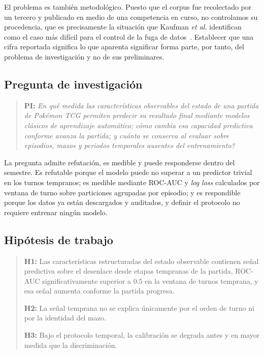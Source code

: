 \documentclass[conference]{IEEEtran}
\begin{document}
El problema es tambi\'en metodol\'ogico. Puesto que el corpus fue
recolectado por un tercero y publicado en medio de una competencia en
curso, no controlamos su procedencia, que es precisamente la situaci\'on
que Kaufman \textit{et al.} identifican como el caso m\'as dif\'icil para
el control de la fuga de datos~\cite{kaufman_leakage_2011}. Establecer que
una cifra reportada significa lo que aparenta significar forma parte, por
tanto, del problema de investigaci\'on y no de sus preliminares.

\subsection{Pregunta de investigaci\'on}
\label{subsec:rq}
\begin{quote}
\textbf{PI:} \textit{\textquestiondown En qu\'e medida las caracter\'isticas observables
del estado de una partida de \emph{Pok\'emon TCG} permiten predecir su
resultado final mediante modelos cl\'asicos de aprendizaje autom\'atico;
c\'omo cambia esa capacidad predictiva conforme avanza la partida; y
cu\'anta se conserva al evaluar sobre episodios, mazos y periodos
temporales ausentes del entrenamiento?}
\end{quote}

\noindent La pregunta admite refutaci\'on, es medible y puede responderse
dentro del semestre. Es refutable porque el modelo puede no superar a un
predictor trivial en los turnos tempranos; es medible mediante ROC-AUC y
\emph{log loss} calculados por ventana de turno sobre particiones
agrupadas por episodio; y es respondible porque los datos ya est\'an
descargados y auditados, y definir el protocolo no requiere entrenar
ning\'un modelo.

\subsection{Hip\'otesis de trabajo}
\label{subsec:hypothesis}
\begin{quote}
\textbf{H1:} Las caracter\'isticas estructuradas del estado observable
contienen se\~nal predictiva sobre el desenlace desde etapas tempranas de
la partida, ROC-AUC significativamente superior a $0.5$ en la ventana de
turnos temprana, y esa se\~nal aumenta conforme la partida progresa.

\textbf{H2:} La se\~nal temprana no se explica \'unicamente por el orden de
turno ni por la identidad del mazo.

\textbf{H3:} Bajo el protocolo temporal, la calibraci\'on se degrada antes
y en mayor medida que la discriminaci\'on.
\end{quote}
\end{document}
